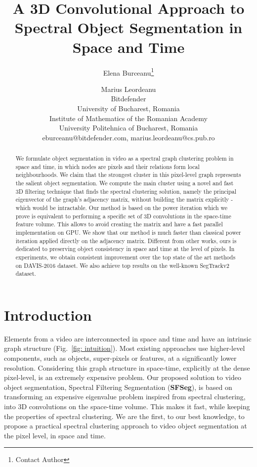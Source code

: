 \documentclass{article}
\title{A 3D Convolutional Approach to Spectral Object Segmentation in Space and Time}
\author{
Elena Burceanu\footnote{Contact Author}\and
Marius Leordeanu\\
\affiliations
Bitdefender\\
University of Bucharest, Romania\\
Institute of Mathematics of the Romanian Academy\\
University Politehnica of Bucharest, Romania\\
\emails
eburceanu@bitdefender.com,
marius.leordeanu@cs.pub.ro
}
\begin{document}
\maketitle

\begin{abstract}
We formulate object segmentation in video as a spectral graph clustering problem in space and time, in which nodes are pixels and their relations form local neighbourhoods. We claim that the strongest cluster in this pixel-level graph represents the salient object segmentation. We compute the main cluster using a novel and fast 3D filtering technique that finds the spectral clustering solution, namely the principal eigenvector of the graph's adjacency matrix, without building the matrix explicitly - which would be intractable. Our method is based on the power iteration which we prove is equivalent to performing a specific set of 3D convolutions in the space-time feature volume. This allows to avoid creating the matrix and have a fast parallel implementation on GPU. We show that our method is much faster than classical power iteration applied directly on the adjacency matrix. Different from other works, ours is dedicated to preserving object consistency in space and time at the level of pixels. 
In experiments, we obtain consistent improvement over the top state of the art methods on DAVIS-2016 dataset. We also achieve top results on the well-known SegTrackv2 dataset.
\end{abstract}


\section{Introduction}
Elements from a video are interconnected in space and time and have an intrinsic graph structure (Fig.~\ref{fig: intuition}). Most existing approaches use higher-level components, such as objects, super-pixels or features, at a significantly lower resolution. Considering this graph structure in space-time, explicitly at the dense pixel-level, is an extremely expensive problem. Our proposed solution to video object segmentation, Spectral Filtering Segmentation (\textbf{SFSeg}), is based on transforming an expensive eigenvalue problem inspired from spectral clustering, into 3D convolutions on the space-time volume. This makes it fast, while keeping the properties of spectral clustering. We are the first, to our best knowledge, to propose a practical spectral clustering approach to video object segmentation at the pixel level, in space and time.
\end{document}
